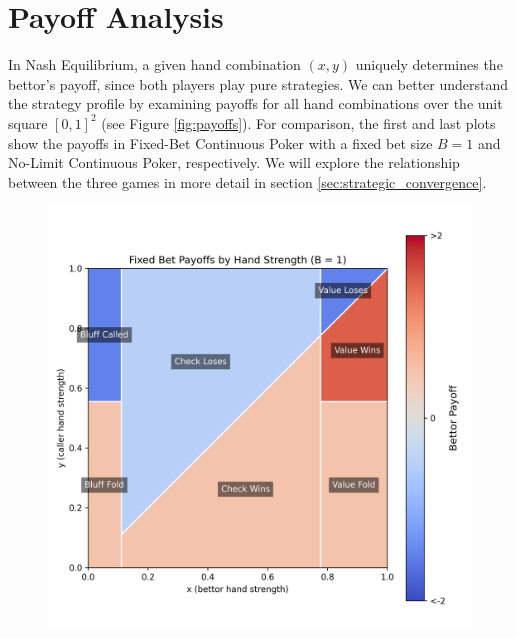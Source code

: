 \documentclass[../../main/main.tex]{subfiles}
\begin{document}
\section{Payoff Analysis}

In Nash Equilibrium, a given hand combination $(x, y)$ uniquely determines the bettor's payoff, since both players play pure strategies. We can better understand the strategy profile by examining payoffs for all hand combinations over the unit square $[0, 1]^2$ (see Figure \ref{fig:payoffs}). For comparison, the first and last plots show the payoffs in Fixed-Bet Continuous Poker with a fixed bet size $B=1$ and No-Limit Continuous Poker, respectively. We will explore the relationship between the three games in more detail in section \ref{sec:strategic_convergence}.

\begin{figure}[h!]
    \begin{adjustwidth}{-1in}{-1in}
        \centering
        \begin{minipage}{0.4\textwidth}
            \centering
            \includegraphics[width=\textwidth]{images/FixedBet_payoffs.png}
        \end{minipage}
        \hspace{0.02\textwidth}

\end{adjustwidth}
\end{figure}
\end{document}
